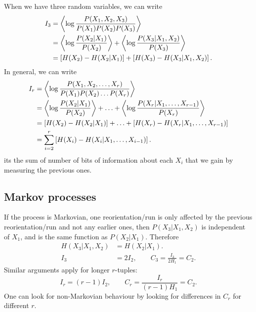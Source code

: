 \documentclass[12pt]{article}
\begin{document}
When we have three random variables, we can write
%
\begin{equation}\label{eq:multiinfcond3}
  \begin{aligned}
    I_3 &= \left\langle \log \frac{P(X_1,X_2,X_3)}{P(X_1)P(X_2)P(X_3)} \right\rangle \\
      &=  \left\langle \log \frac{P(X_2 \vert X_1)}{P(X_2)} \right\rangle + \left\langle \log \frac{P(X_3 \vert X_1,X_2)}{P(X_3)} \right\rangle \\
      &= \left [ H(X_2)-H(X_2|X_1) \right ] +  \left [  H(X_3)-H(X_3|X_1,X_2) \right ].
  \end{aligned}
\end{equation}
%
In general, we can write
%
\begin{equation}\label{eq:multiinfcondgen}
  \begin{aligned}
    I_r &= \left\langle \log \frac{P(X_1,X_2,\ldots,X_r)}{P(X_1)P(X_2)\ldots P(X_r)} \right\rangle \\
      &=  \left\langle \log \frac{P(X_2 \vert X_1)}{P(X_2)} \right\rangle +\ldots+ \left\langle \log \frac{P(X_r \vert X_1,\ldots,X_{r-1})}{P(X_r)} \right\rangle \\
      &= \left [ H(X_2)-H(X_2|X_1) \right ] + \ldots + \left [  H(X_r)-H(X_r|X_1,\ldots,X_{r-1}) \right ] \\
      &= \sum_{i=2}^{r} \left [  H(X_i)-H(X_i|X_1,\ldots,X_{i-1}) \right ].
  \end{aligned}
\end{equation}
%
\ie its the sum of number of bits of information about each $X_i$ that we gain by measuring the previous ones.


\subsection{Markov processes}\label{sec:markov}

If the process is Markovian, \ie one reorientation/run is only affected by the previous reorientation/run and not any earlier ones, then $P(X_3 \vert X_1,X_2)$ is independent of $X_1$, and is the same function as $P(X_2 \vert X_1)$. Therefore
%
\begin{equation}\label{eq:tripvspair}
  \begin{aligned}
    H(X_3|X_1,X_2) &= H(X_2|X_1).\\
    I_3 &= 2I_2, \qquad C_3 = \frac{I_3}{2H_1} = C_2.
  \end{aligned}
\end{equation}
%
Similar arguments apply for longer $r$-tuples:
 \begin{equation}\label{eq:markovinf}
   I_r = (r-1)I_2, \qquad C_r = \frac{I_r}{(r-1)H_1} = C_2.
\end{equation}
%
One can look for non-Markovian behaviour by looking for differences in $C_r$ for different $r$.
\end{document}
